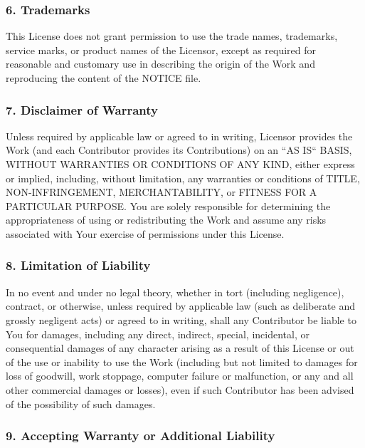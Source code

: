 \documentclass[a4paper, 11pt, twoside]{article}
\begin{document}
\subsubsection{6. Trademarks}

This License does not grant permission to use the trade names, trademarks, service marks, or product names of the Licensor, except as required for reasonable and customary use in describing the origin of the Work and reproducing the content of the NOTICE file.

\subsubsection{7. Disclaimer of Warranty}

Unless required by applicable law or agreed to in writing, Licensor provides the Work (and each Contributor provides its Contributions) on an “AS IS“ BASIS, WITHOUT WARRANTIES OR CONDITIONS OF ANY KIND, either express or implied, including, without limitation, any warranties or conditions of TITLE, NON-INFRINGEMENT, MERCHANTABILITY, or FITNESS FOR A PARTICULAR PURPOSE. You are solely responsible for determining the appropriateness of using or redistributing the Work and assume any risks associated with Your exercise of permissions under this License.

\subsubsection{8. Limitation of Liability}

In no event and under no legal theory, whether in tort (including negligence), contract, or otherwise, unless required by applicable law (such as deliberate and grossly negligent acts) or agreed to in writing, shall any Contributor be liable to You for damages, including any direct, indirect, special, incidental, or consequential damages of any character arising as a result of this License or out of the use or inability to use the Work (including but not limited to damages for loss of goodwill, work stoppage, computer failure or malfunction, or any and all other commercial damages or losses), even if such Contributor has been advised of the possibility of such damages.

\subsubsection{9. Accepting Warranty or Additional Liability}
\end{document}
